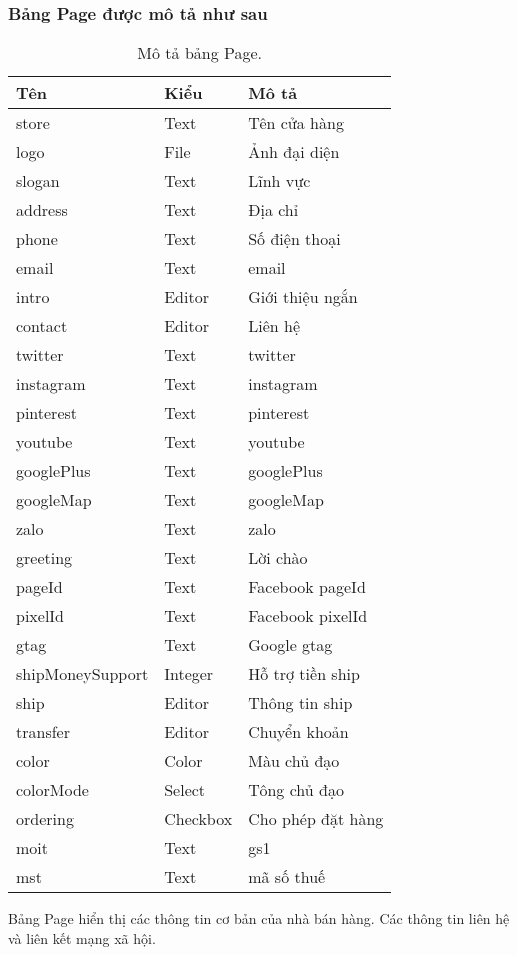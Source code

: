\subsubsection{Bảng Page được mô tả như sau}
\begin{table}[!htbp]\fontsize{13px}{13px}\selectfont\justifying
\begin{center}
\caption{Mô tả bảng Page.}
\begin{tabularx}{0.6\textwidth}{ |l|l|X| } 
\hline
Tên & Kiểu & Mô tả \\
\hline
store & Text & Tên cửa hàng \\
logo & File & Ảnh đại diện \\
slogan & Text & Lĩnh vực \\
address & Text & Địa chỉ \\
phone & Text & Số điện thoại \\
email & Text & email \\
intro & Editor & Giới thiệu ngắn \\
contact & Editor & Liên hệ \\
twitter & Text & twitter \\
instagram & Text & instagram \\
pinterest & Text & pinterest \\
youtube & Text & youtube \\
googlePlus & Text & googlePlus \\
googleMap & Text & googleMap \\
zalo & Text & zalo \\
greeting & Text & Lời chào \\
pageId & Text & Facebook pageId \\
pixelId & Text & Facebook pixelId \\
gtag & Text & Google gtag \\
shipMoneySupport & Integer & Hỗ trợ tiền ship \\
ship & Editor & Thông tin ship \\
transfer & Editor & Chuyển khoản \\
color & Color & Màu chủ đạo \\
colorMode & Select & Tông chủ đạo \\
ordering & Checkbox & Cho phép đặt hàng \\
moit & Text & gs1 \\
mst & Text & mã số thuế \\


\hline
\end{tabularx}
\label{table:Page}
\end{center}
Bảng Page hiển thị các thông tin cơ bản của nhà bán hàng. Các thông tin liên hệ và liên kết mạng xã hội.
\end{table}

